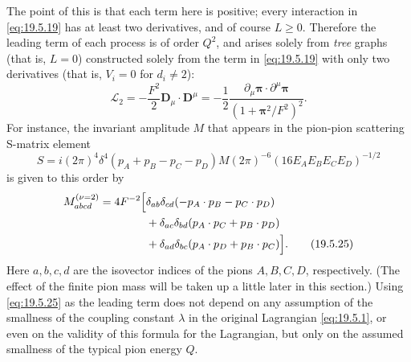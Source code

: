 The point of this is that each term here is positive; every interaction in \eqref{eq:19.5.19} has at least two derivatives, and of course $L\geq0$. Therefore the leading term of each process is of order $Q^2$, and arises solely from \emph{tree} graphs (that is, $L=0$) constructed solely from the term in \eqref{eq:19.5.19} with only two derivatives (that is, $V_i=0$ for $d_i\neq2$):
\begin{equation}
\mathcal L_2
=-\frac{F^2}{2}\boldsymbol D_\mu\cdot\boldsymbol D^\mu
=-\frac{1}{2}
\frac{\partial_\mu\boldsymbol{\pi}\cdot
\partial^\mu\boldsymbol{\pi}}
{(1+\boldsymbol{\pi}^2/F^2)^2}.
\tag{19.5.23}\label{eq:19.5.23}
\end{equation}
For instance, the invariant amplitude $M$ that appears in the pion-pion scattering S-matrix element
\begin{equation}
S=i(2\pi)^4\delta^4(p_A+p_B-p_C-p_D)M
(2\pi)^{-6}(16E_AE_BE_CE_D)^{-1/2}
\tag{19.5.24}\label{eq:19.5.24}
\end{equation}
is given to this order by
\begin{align}
M_{abcd}^{(\nu=2)}
=4F^{-2}\Big[&
\delta_{ab}\delta_{cd}(-p_A\cdot p_B-p_C\cdot p_D)
\notag\\
&+\delta_{ac}\delta_{bd}(p_A\cdot p_C+p_B\cdot p_D)
\notag\\
&+\delta_{ad}\delta_{bc}(p_A\cdot p_D+p_B\cdot p_C)
\Big].
\tag{19.5.25}\label{eq:19.5.25}
\end{align}
Here $a,b,c,d$ are the isovector indices of the pions $A,B,C,D$, respectively. (The effect of the finite pion mass will be taken up a little later in this section.) Using \eqref{eq:19.5.25} as the leading term does not depend on any assumption of the smallness of the coupling constant $\lambda$ in the original Lagrangian \eqref{eq:19.5.1}, or even on the validity of this formula for the Lagrangian, but only on the assumed smallness of the typical pion energy $Q$.

